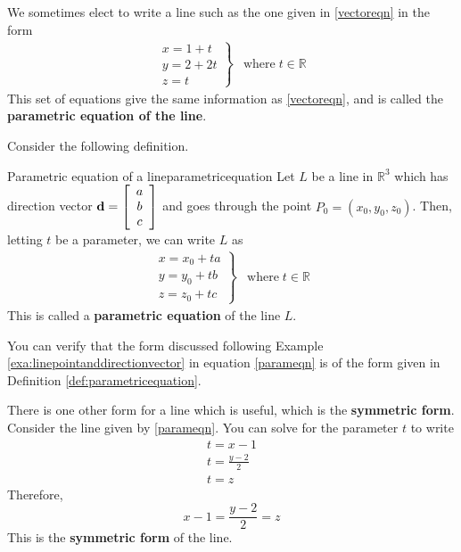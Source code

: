 We sometimes elect to write a line such as the one given in \ref{vectoreqn} in the form
\begin{equation}
\begin{array}{ll}
\left. \begin{array}{l}
x=1+t \\
y=2+2t \\
z=t 
\end{array} \right\} & 
\mbox{where} \; t\in \mathbb{R} 
\end{array}
\label{parameqn}
\end{equation}
This set of equations give the same information as \ref{vectoreqn}, and is called the \textbf{parametric equation of the line}. 

Consider the following definition. 

\begin{definition}{Parametric equation of a line}{parametricequation}
Let $L$ be a line in $\mathbb{R}^3$ which has direction vector ${\bf d} = \left[
\begin{array}{c}
a \\
b \\
c
\end{array}
\right]$
and goes through the point $P_0 = \left( x_0, y_0, z_0 \right)$.
Then, letting $t$ be a parameter, we can write $L$ as 
\begin{equation*}
\begin{array}{ll}
\left.
\begin{array}{c}
x = x_0 + ta \\
y = y_0 + tb \\
z = z_0 + tc
\end{array}
\right\} & 
\mbox{where} \; t\in \mathbb{R} 
\end{array}
\end{equation*}
This is called a \textbf{parametric equation} of the line $L$.
\end{definition}

You can verify that the form discussed following Example \ref{exa:linepointanddirectionvector} in equation  \ref{parameqn} is of the form
given in Definition \ref{def:parametricequation}.

There is one other form for a line which is useful, which is the \textbf{symmetric form}. 
Consider the line given by  \ref{parameqn}. You can
solve for the parameter $t$ to write
\begin{equation*}
\begin{array}{l}
t=x-1 \\
t=\frac{y-2}{2} \\
t=z
\end{array}
\end{equation*}
Therefore, 
\begin{equation*}
x-1=\frac{y-2}{2}=z
\end{equation*}
This is the \textbf{symmetric form} of the line.

